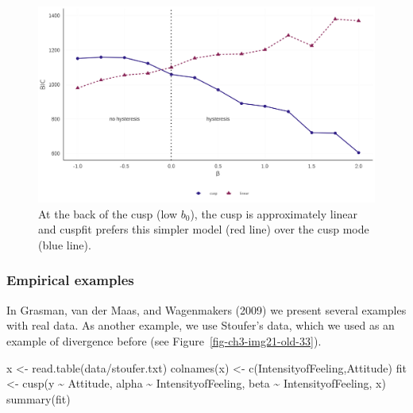 \documentclass[
  a4paper,
  DIV=11,
  numbers=noendperiod,
  oneside]{scrreprt}
\newenvironment{Shaded}{\begin{snugshade}}{\end{snugshade}}
\newcommand{\FunctionTok}[1]{\textcolor[rgb]{0.28,0.35,0.67}{#1}}
\newcommand{\NormalTok}[1]{\textcolor[rgb]{0.00,0.23,0.31}{#1}}
\newcommand{\OtherTok}[1]{\textcolor[rgb]{0.00,0.23,0.31}{#1}}
\newcommand{\SpecialCharTok}[1]{\textcolor[rgb]{0.37,0.37,0.37}{#1}}
\newcommand{\StringTok}[1]{\textcolor[rgb]{0.13,0.47,0.30}{#1}}
\begin{document}
\begin{figure}

{\centering \includegraphics{media/ch3/fig-ch3-img23-old-35.jpg}

}

\caption{\label{fig-ch3-img23-old-35}At the back of the cusp (low
\(b_0\)), the cusp is approximately linear and cuspfit prefers this
simpler model (red line) over the cusp mode (blue line).}

\end{figure}

\hypertarget{sec-Empirical-examples}{%
\subsubsection{Empirical examples}\label{sec-Empirical-examples}}

In Grasman, van der Maas, and Wagenmakers (2009) we present several
examples with real data. As another example, we use Stoufer's data,
which we used as an example of divergence before (see
Figure~\ref{fig-ch3-img21-old-33}).

\begin{Shaded}
\begin{Highlighting}[]
\NormalTok{x }\OtherTok{\textless{}{-}} \FunctionTok{read.table}\NormalTok{(}\StringTok{\textquotesingle{}data/stoufer.txt\textquotesingle{}}\NormalTok{)}
\FunctionTok{colnames}\NormalTok{(x) }\OtherTok{\textless{}{-}} \FunctionTok{c}\NormalTok{(}\StringTok{\textquotesingle{}IntensityofFeeling\textquotesingle{}}\NormalTok{,}\StringTok{\textquotesingle{}Attitude\textquotesingle{}}\NormalTok{)}
\NormalTok{fit }\OtherTok{\textless{}{-}} \FunctionTok{cusp}\NormalTok{(y }\SpecialCharTok{\textasciitilde{}}\NormalTok{ Attitude, alpha }\SpecialCharTok{\textasciitilde{}}\NormalTok{ IntensityofFeeling, beta }\SpecialCharTok{\textasciitilde{}}\NormalTok{ IntensityofFeeling, x)}
\FunctionTok{summary}\NormalTok{(fit)}
\end{Highlighting}
\end{Shaded}
\end{document}
